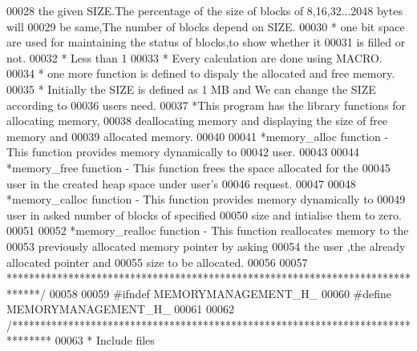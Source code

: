 \begin{DoxyCode}
00028 \textcolor{comment}{   the given SIZE.The percentage of the size of blocks of 8,16,32...2048 bytes will }
00029 \textcolor{comment}{   be same,The number of blocks depend on SIZE.   }
00030 \textcolor{comment}{ * one bit space are used for maintaining the status of blocks,to show whether it }
00031 \textcolor{comment}{   is filled or not.}
00032 \textcolor{comment}{ * Less than 1%
00033 \textcolor{comment}{ * Every calculation are done using MACRO.}
00034 \textcolor{comment}{ * one more function is defined to dispaly the allocated and free memory.}
00035 \textcolor{comment}{ * Initially the SIZE is defined as 1 MB and We can change the SIZE according to }
00036 \textcolor{comment}{   users need.}
00037 \textcolor{comment}{ *This program has the library functions for allocating memory,}
00038 \textcolor{comment}{           deallocating memory and displaying the size of free memory and }
00039 \textcolor{comment}{       allocated memory.}
00040 \textcolor{comment}{}
00041 \textcolor{comment}{   *memory\_alloc function - This function provides memory dynamically to }
00042 \textcolor{comment}{                        user.  }
00043 \textcolor{comment}{}
00044 \textcolor{comment}{   *memory\_free function - This function frees the space allocated for the}
00045 \textcolor{comment}{               user in the created heap space under user's }
00046 \textcolor{comment}{                           request.}
00047 \textcolor{comment}{}
00048 \textcolor{comment}{   *memory\_calloc function - This function provides memory dynamically to }
00049 \textcolor{comment}{                             user in asked number of blocks of specified }
00050 \textcolor{comment}{                             size and intialise them to zero.}
00051 \textcolor{comment}{}
00052 \textcolor{comment}{   *memory\_realloc function - This function reallocates memory to the }
00053 \textcolor{comment}{                          previously allocated memory pointer by asking  }
00054 \textcolor{comment}{                              the user ,the already allocated pointer and  }
00055 \textcolor{comment}{                              size to be allocated.}
00056 \textcolor{comment}{}
00057 \textcolor{comment}{ ******************************************************************************/}
00058 
00059 \textcolor{preprocessor}{#ifndef MEMORYMANAGEMENT\_H\_}
00060 \textcolor{preprocessor}{#define MEMORYMANAGEMENT\_H\_}
00061 
00062 \textcolor{comment}{/*******************************************************************************}
00063 \textcolor{comment}{ * Include files}
}
\end{DoxyCode}
